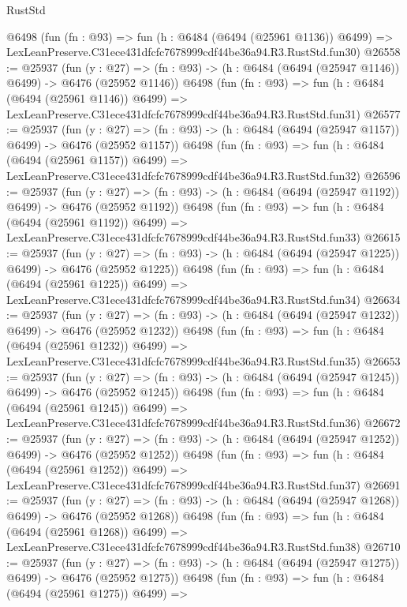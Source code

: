 \begin{lexlean}{RustStd}
\begin{coremodule}
    @6498
    (fun (fn : @93) =>
    fun (h : @6484 (@6494 (@25961 @1136)) @6499) =>
    LexLeanPreserve.C31ece431dfcfc7678999cdf44be36a94.R3.RustStd.fun30)
@26558 := @25937
    (fun (y : @27) =>
    (fn : @93) -> (h : @6484 (@6494 (@25947 @1146)) @6499) -> @6476 (@25952 @1146))
    @6498
    (fun (fn : @93) =>
    fun (h : @6484 (@6494 (@25961 @1146)) @6499) =>
    LexLeanPreserve.C31ece431dfcfc7678999cdf44be36a94.R3.RustStd.fun31)
@26577 := @25937
    (fun (y : @27) =>
    (fn : @93) -> (h : @6484 (@6494 (@25947 @1157)) @6499) -> @6476 (@25952 @1157))
    @6498
    (fun (fn : @93) =>
    fun (h : @6484 (@6494 (@25961 @1157)) @6499) =>
    LexLeanPreserve.C31ece431dfcfc7678999cdf44be36a94.R3.RustStd.fun32)
@26596 := @25937
    (fun (y : @27) =>
    (fn : @93) -> (h : @6484 (@6494 (@25947 @1192)) @6499) -> @6476 (@25952 @1192))
    @6498
    (fun (fn : @93) =>
    fun (h : @6484 (@6494 (@25961 @1192)) @6499) =>
    LexLeanPreserve.C31ece431dfcfc7678999cdf44be36a94.R3.RustStd.fun33)
@26615 := @25937
    (fun (y : @27) =>
    (fn : @93) -> (h : @6484 (@6494 (@25947 @1225)) @6499) -> @6476 (@25952 @1225))
    @6498
    (fun (fn : @93) =>
    fun (h : @6484 (@6494 (@25961 @1225)) @6499) =>
    LexLeanPreserve.C31ece431dfcfc7678999cdf44be36a94.R3.RustStd.fun34)
@26634 := @25937
    (fun (y : @27) =>
    (fn : @93) -> (h : @6484 (@6494 (@25947 @1232)) @6499) -> @6476 (@25952 @1232))
    @6498
    (fun (fn : @93) =>
    fun (h : @6484 (@6494 (@25961 @1232)) @6499) =>
    LexLeanPreserve.C31ece431dfcfc7678999cdf44be36a94.R3.RustStd.fun35)
@26653 := @25937
    (fun (y : @27) =>
    (fn : @93) -> (h : @6484 (@6494 (@25947 @1245)) @6499) -> @6476 (@25952 @1245))
    @6498
    (fun (fn : @93) =>
    fun (h : @6484 (@6494 (@25961 @1245)) @6499) =>
    LexLeanPreserve.C31ece431dfcfc7678999cdf44be36a94.R3.RustStd.fun36)
@26672 := @25937
    (fun (y : @27) =>
    (fn : @93) -> (h : @6484 (@6494 (@25947 @1252)) @6499) -> @6476 (@25952 @1252))
    @6498
    (fun (fn : @93) =>
    fun (h : @6484 (@6494 (@25961 @1252)) @6499) =>
    LexLeanPreserve.C31ece431dfcfc7678999cdf44be36a94.R3.RustStd.fun37)
@26691 := @25937
    (fun (y : @27) =>
    (fn : @93) -> (h : @6484 (@6494 (@25947 @1268)) @6499) -> @6476 (@25952 @1268))
    @6498
    (fun (fn : @93) =>
    fun (h : @6484 (@6494 (@25961 @1268)) @6499) =>
    LexLeanPreserve.C31ece431dfcfc7678999cdf44be36a94.R3.RustStd.fun38)
@26710 := @25937
    (fun (y : @27) =>
    (fn : @93) -> (h : @6484 (@6494 (@25947 @1275)) @6499) -> @6476 (@25952 @1275))
    @6498
    (fun (fn : @93) =>
    fun (h : @6484 (@6494 (@25961 @1275)) @6499) =>

\end{coremodule}
\end{lexlean}
